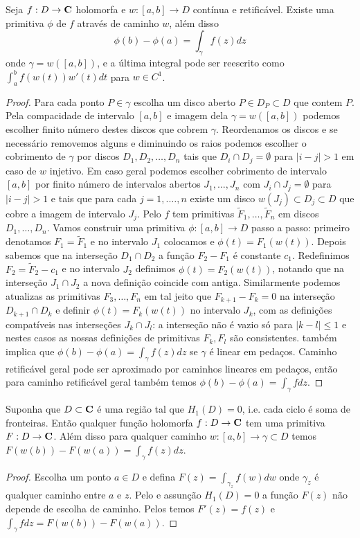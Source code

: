 \begin{teorema}
\label{t:primitiva-caminho}
Seja $f : D\to \mathbf{C}$ holomorfa e $w: [a,b] \to D$ contínua e retificável.
Existe uma primitiva $\phi$ de $f$ através de caminho $w$,
além disso
\[ \phi(b) - \phi(a) = \int_\gamma f(z) dz \]
onde $\gamma = w([a,b])$, e a última integral pode ser reescrito como
$\int_a^b f(w(t)) w'(t) dt$ para $w\in C^1$.
\end{teorema}
\begin{proof}
Para cada ponto $P \in \gamma$ escolha um disco aberto $P \in D_P \subset D$ que contem $P$.
Pela compacidade de intervalo $[a,b]$ e imagem dela $\gamma = w([a,b])$
podemos escolher finito número destes discos que cobrem $\gamma$.
Reordenamos os discos e se necessário removemos alguns e diminuindo os raios podemos escolher
o cobrimento de $\gamma$ por discos $D_1,D_2,\dots,D_n$ tais que
$D_i \cap D_j = \emptyset$ para $|i-j| > 1$ em caso de $w$ injetivo.
Em caso geral podemos escolher cobrimento de intervalo $[a,b]$ por finito número
de intervalos abertos $J_1,\dots,J_n$ com $J_i \cap J_j = \emptyset$ para $|i-j|>1$
e tais que para cada $j=1,.\dots,n$ existe um disco $w(J_j) \subset D_j \subset D$
que cobre a imagem de intervalo $J_j$.
Pelo  $f$ tem primitivas $\tilde{F}_1,\dots,\tilde{F}_n$ em discos $D_1,\dots,D_n$.
Vamos construir uma primitiva $\phi: [a,b] \to D$ passo a passo:
primeiro denotamos $F_1 = \tilde{F}_1$ e no intervalo $J_1$ colocamos  e $\phi(t) = F_1(w(t))$.
Depois sabemos que na interseção $D_1 \cap D_2$ a função $F_2 - F_1$ é constante $c_1$.
Redefinimos $F_2 = \tilde{F}_2 - c_1$ e no intervalo $J_2$ definimos $\phi(t) = F_2(w(t))$,
notando que na interseção $J_1 \cap J_2$ a nova definição coincide com antiga.
Similarmente podemos atualizas as primitivas $F_3,\dots,F_n$ em tal jeito que
$F_{k+1} - F_k = 0$ na interseção $D_{k+1} \cap D_k$ e definir $\phi(t) = F_k(w(t))$ no
intervalo $J_k$, com as definições compatíveis nas interseções $J_k \cap J_l$:
a interseção não é vazio só para $|k-l|\leq 1$ e nestes casos as nossas definições de primitivas $F_k,F_l$
são consistentes.
 também implica que $\phi(b)-\phi(a) = \int_\gamma f(z) dz$ se $\gamma$
é linear em pedaços. Caminho retificável geral pode ser aproximado por caminhos lineares em pedaços,
então para caminho retificável geral também temos $\phi(b)-\phi(a) = \int_\gamma f  dz$.
\end{proof}

\begin{teorema}
Suponha que $D\subset \mathbf{C}$ é uma região tal que $H_1(D) = 0$, i.e. cada ciclo é soma de fronteiras.
Então qualquer função holomorfa $f : D \to \mathbf{C}$ tem uma primitiva $F : D\to \mathbf{C}$.
Além disso para qualquer caminho $w : [a,b] \to \gamma \subset D$ temos
$F(w(b)) - F(w(a)) = \int_\gamma f(z) dz$.
\end{teorema}
\begin{proof}
Escolha um ponto $a\in D$ e defina $F(z) = \int_{\gamma_z} f(w) dw$ onde $\gamma_z$ é qualquer caminho
entre $a$ e $z$. Pelo  e assunção $H_1(D) = 0$ a função $F(z)$ não depende
de escolha de caminho. Pelos  temos
$F'(z) = f(z)$ e $\int_\gamma f dz = F(w(b)) - F(w(a))$.
\end{proof}

